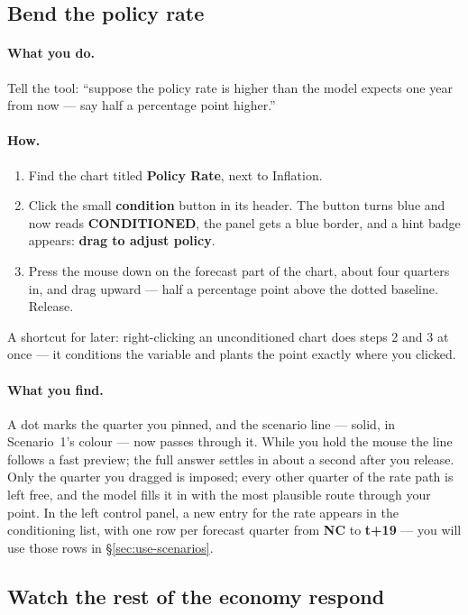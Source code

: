 \documentclass[11pt]{article}
\theoremstyle{definition}
\theoremstyle{remark}
\begin{document}
\subsection{Bend the policy rate}

\paragraph{What you do.} Tell the tool: ``suppose the policy rate is higher than
the model expects one year from now --- say half a percentage point higher.''

\paragraph{How.}
\begin{enumerate}
  \item Find the chart titled \textbf{Policy Rate}, next to Inflation.
  \item Click the small \textbf{condition} button in its header. The button turns
    blue and now reads \textbf{CONDITIONED}, the panel gets a blue border, and a
    hint badge appears: \textbf{drag to adjust policy}.
  \item Press the mouse down on the forecast part of the chart, about four
    quarters in, and drag upward --- half a percentage point above the dotted
    baseline. Release.
\end{enumerate}
A shortcut for later: right-clicking an unconditioned chart does steps 2 and 3 at
once --- it conditions the variable and plants the point exactly where you clicked.

\paragraph{What you find.} A dot marks the quarter you pinned, and the scenario
line --- solid, in Scenario~1's colour --- now passes through it. While you hold
the mouse the line follows a fast preview; the full answer settles in about a
second after you release. Only the quarter you dragged is imposed; every other
quarter of the rate path is left free, and the model fills it in with the most
plausible route through your point. In the left control panel, a new entry for the
rate appears in the conditioning list, with one row per forecast quarter from
\textbf{NC} to \textbf{t+19} --- you will use those rows in
\S\ref{sec:use-scenarios}.

\subsection{Watch the rest of the economy respond}
\end{document}
